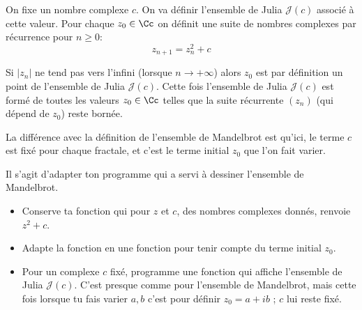 \documentclass[11pt,class=report,crop=false]{standalone}
\begin{document}
\begin{cours}
	



On fixe un nombre complexe $c$. On va définir l'ensemble de Julia $\mathcal{J}(c)$ associé à cette valeur.
Pour chaque $z_0 \in \Cc$ on définit une suite de nombres complexes par récurrence pour $n \ge 0$:
$$z_{n+1} = z_n^2 + c$$

Si $|z_n|$ ne tend pas vers l'infini (lorsque $n \to +\infty$) alors $z_0$ est par définition un point de l'ensemble de Julia $\mathcal{J}(c)$.
Cette fois l'ensemble de Julia $\mathcal{J}(c)$ est formé de toutes les valeurs $z_0\in\Cc$ telles que la suite récurrente $(z_n)$ (qui dépend de $z_0$) reste bornée.

La différence avec la définition de l'ensemble de Mandelbrot est qu'ici, le terme $c$ est fixé pour chaque fractale, et c'est le terme initial $z_0$ que l'on fait varier.
\end{cours}


\bigskip


\begin{activite}


Il s'agit d'adapter ton programme qui a servi à dessiner l'ensemble de Mandelbrot.

\begin{itemize}
  \item Conserve ta fonction  qui pour $z$ et $c$, des nombres complexes donnés, renvoie $z^2+c$.
  
  
  \item Adapte la fonction  en une fonction 
  pour tenir compte du terme initial $z_0$.
  
  \item Pour un complexe $c$ fixé, programme une fonction 
  qui affiche l'ensemble de Julia $\mathcal{J}(c)$. C'est presque comme pour l'ensemble de Mandelbrot, mais cette fois lorsque tu fais varier $a,b$ c'est pour définir $z_0 = a + ib$ ; $c$ lui reste fixé.
  
  
\end{itemize}
\end{activite}
\end{document}
